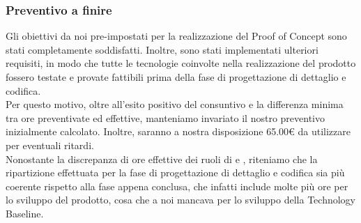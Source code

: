 \subsubsection{Preventivo a finire}
Gli obiettivi da noi pre-impostati per la realizzazione del Proof of Concept sono stati completamente soddisfatti. Inoltre, sono stati implementati ulteriori requisiti, in modo che tutte le tecnologie coinvolte nella realizzazione del prodotto fossero testate e provate fattibili prima della fase di progettazione di dettaglio e codifica.\\

Per questo motivo, oltre all'esito positivo del consuntivo e la differenza minima tra ore preventivate ed effettive, manteniamo invariato il nostro preventivo inizialmente calcolato. Inoltre, saranno a nostra disposizione 65.00\euro{} da utilizzare per eventuali ritardi.\\

Nonostante la discrepanza di ore effettive dei ruoli di \programProg{} e \progetProg{}, riteniamo che la ripartizione effettuata per la fase di progettazione di dettaglio e codifica sia più coerente rispetto alla fase appena conclusa, che infatti include molte più ore per lo sviluppo del prodotto, cosa che a noi mancava per lo sviluppo della Technology Baseline. 

